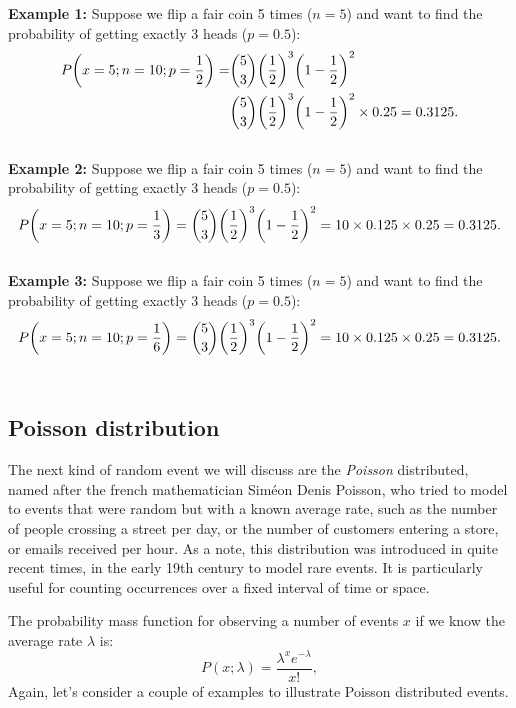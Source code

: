 \documentclass{book}
\begin{document}
\textbf{Example 1:} Suppose we flip a fair coin 5 times ($n=5$) and want to find the probability of getting exactly 3 heads ($p=0.5$):
\begin{align}
    P\bigg(x=5; n = 10; p = \frac{1}{2}\bigg) = &\binom{5}{3} \bigg(\frac{1}{2}\bigg)^3 \bigg(1 - \frac{1}{2}\bigg)^2  \notag \\
    &\binom{5}{3} \bigg(\frac{1}{2}\bigg)^3 \bigg(1 - \frac{1}{2}\bigg)^2  \notag \times 0.25 = 0.3125.
\end{align}\\

\textbf{Example 2:} Suppose we flip a fair coin 5 times ($n=5$) and want to find the probability of getting exactly 3 heads ($p=0.5$):
\begin{equation}
    P\bigg(x=5; n = 10; p = \frac{1}{3}\bigg) = \binom{5}{3} \bigg(\frac{1}{2}\bigg)^3 \bigg(1 - \frac{1}{2}\bigg)^2 = 10 \times 0.125 \times 0.25 = 0.3125. \notag
\end{equation}\\

\textbf{Example 3:} Suppose we flip a fair coin 5 times ($n=5$) and want to find the probability of getting exactly 3 heads ($p=0.5$):
\begin{equation}
    P\bigg(x=5; n = 10; p = \frac{1}{6}\bigg) = \binom{5}{3} \bigg(\frac{1}{2}\bigg)^3 \bigg(1 - \frac{1}{2}\bigg)^2 = 10 \times 0.125 \times 0.25 = 0.3125. \notag
\end{equation}\\

\newpage
\subsection{Poisson distribution}
The next kind of random event we will discuss are the \textit{Poisson} distributed, named after the french mathematician Sim\'eon Denis Poisson, who tried to model to events that were random but with a known average rate, such as the number of people crossing a street per day, or the number of customers entering a store, or emails received per hour.
As a note, this distribution was introduced in quite recent times, in the early 19th century to model rare events. It is particularly useful for counting occurrences over a fixed interval of time or space. 

The probability mass function for observing a number of events $x$ if we know the average rate $\lambda$ is:
\begin{equation}
    P(x; \lambda) = \frac{\lambda^x e^{-\lambda}}{x!},
\end{equation}
Again, let's consider a couple of examples to illustrate Poisson distributed events.
\end{document}
